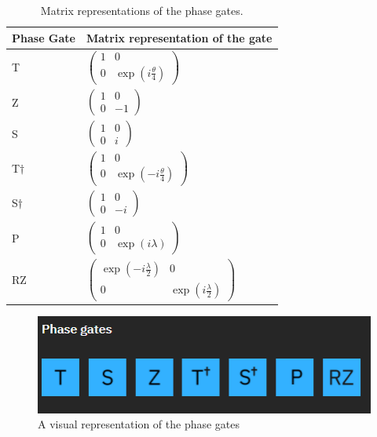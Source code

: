 \begin{table}[]
\label{tab:pgates}
        \begin{tabular}{l|l}
        \hline
        \multicolumn{1}{|l|}{Phase Gate}  & \multicolumn{1}{l|}{Matrix representation of the gate}               \\ \hline
        T                                 & $\begin{pmatrix}1&0 \\ 0& \exp(i\frac{\theta}{4})\end{pmatrix}$      \\
        Z                                 & $\begin{pmatrix}1&0 \\ 0& -1\end{pmatrix}$                           \\
        S                                 & $\begin{pmatrix}1&0 \\ 0& i\end{pmatrix}$                            \\
        T$\dagger$                        & $\begin{pmatrix}1&0 \\ 0& \exp(-i\frac{\theta}{4})\end{pmatrix}$     \\
        S$\dagger $                       & $\begin{pmatrix}1&0 \\ 0& -i\end{pmatrix}$                           \\
        P                                 & $\begin{pmatrix}1&0 \\ 0& \exp(i\lambda)\end{pmatrix}$               \\
        RZ                                & $\begin{pmatrix}\exp(-i\frac{\lambda}{2})&0 \\ 0& \exp(i\frac{\lambda}{2})\end{pmatrix}$                                    
        \end{tabular}
        \caption{Matrix representations of the phase gates.}
\end{table}
    
\begin{figure} [h]
    \centering
    \includegraphics[width=\textwidth]{img/phase-gates.PNG}
        \caption{A visual representation of the phase gates}
        \label{fig:phase gates}
\end{figure}

